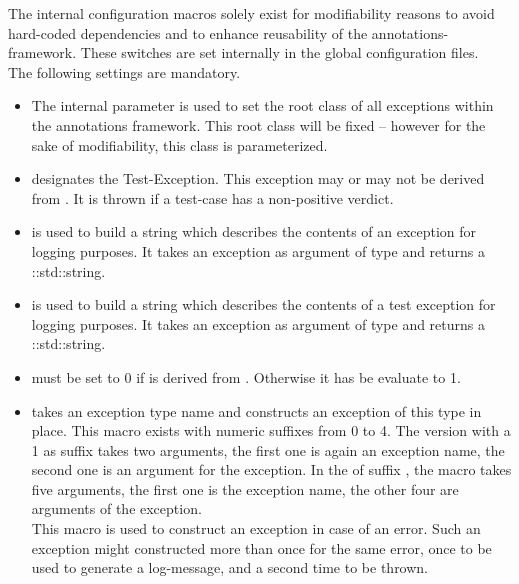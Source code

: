The internal configuration macros solely exist for modifiability
reasons to avoid hard-coded dependencies and to enhance reusability of
the annotations-framework. These switches are set internally in the
global configuration files.\\
%
The following settings are mandatory. 

\begin{itemize}
\item The internal parameter \InternalParamBaseExceptionType is used to set the
  root class of all \SYNEIGHT exceptions within the annotations
  framework. This root class will be fixed -- however for the sake of
  modifiability, this class is parameterized.
\item \InternalParamTestExceptionType designates the Test-Exception.
  This exception may or may not be derived from
  \InternalParamBaseExceptionType. It is thrown if a test-case has a
  non-positive verdict.
\item \InternalParamExceptionStrWhat is used to build a string which
  describes the contents of an exception for logging purposes. It
  takes an exception as argument of type
  \InternalParamBaseExceptionType and returns a ::std::string.
\item \InternalParamTestExceptionStrWhat is used to build a string
  which describes the contents of a test exception for logging
  purposes. It takes an exception as argument of type
  \InternalParamTestExceptionType and returns a ::std::string.
\item \InternalSwitchHandleTestExceptionExplicitly must be set to 0 if
  \InternalParamTestExceptionType is derived from
  \InternalParamBaseExceptionType. Otherwise it has be evaluate to 1.
\item \InternalParamExceptionA takes an exception type name and
  constructs an exception of this type in place. This macro exists with
  numeric suffixes from 0 to 4. The version with a 1 as suffix
  \InternalParamExceptionB takes two arguments, the first one is again
  an exception name, the second one is an argument for the exception.
  In the of suffix \InternalParamExceptionE, the macro takes five
  arguments, the first one is the exception name, the other four are
  arguments of the exception.\\
  This macro is used to construct an exception in case of an
  error. Such an exception might constructed more than once for the
  same error, once to be used to generate a log-message, and a second
  time to be thrown. 

\end{itemize}
